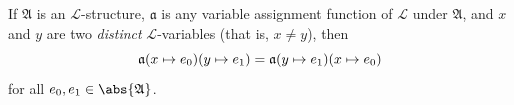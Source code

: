 \begin{thm}
     \label{thm:first-order-language-the-order-of-variable-modification-of-modified-variable-assignment-functions-does-not-matter-as-long-as-the-variable-symbols-are-distinct}
    If \( \mathfrak{A} \) is an \( \mathcal{L} \)-structure, \( \mathfrak{a} \) is any variable assignment function of \( \mathcal{L} \) under \( \mathfrak{A} \), and
    \( x \) and \( y \) are two \emph{distinct} \( \mathcal{L} \)-variables (that is, \( x \neq y \)), then
    \begin{equation*}
        \folmodifiedvariableassignmentfunction{ \folmodifiedvariableassignmentfunction{\mathfrak{a}}{x}{e_{0}} }{y}{e_{1}} =
        \folmodifiedvariableassignmentfunction{ \folmodifiedvariableassignmentfunction{\mathfrak{a}}{y}{e_{1}} }{x}{e_{0}}
    \end{equation*}
    for all \( e_{0}, e_{1} \in \abs{\mathfrak{A}} \).
\end{thm}

